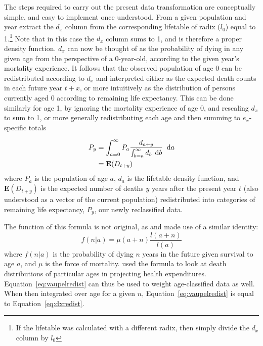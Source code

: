  \FloatBarrier
\label{sec:thetransformation}
The steps required to carry out the present data transformation are conceptually
simple, and easy to implement once understood. From a given
population and year extract the $d_x$ column from the corresponding lifetable of
radix ($l_0$) equal to 1.\footnote{If the lifetable was calculated with a
different radix, then simply divide the $d_x$ column by $l_0$} Note that in
this case the $d_x$ column sums to 1, and is therefore a proper density function. 
$d_x$ can now be thought of as the probability of dying in any given age from the
 perspective of a 0-year-old, according to the given year's mortality
 experience. It follows that the observed population of age 0 can be
 redistributed according to $d_x$ and interpreted either as the expected death
 counts in each future year
$t+x$, or more intuitively as the distribution of persons currently aged 0
according to remaining life expectancy. This can be done similarly for age 1, by ignoring the 
mortality experience of age 0, and rescaling $d_x$ to
sum to 1, or more generally redistributing each age and then summing to
$e_x$-specific totals

\begin{align}
\label{eq:dxredist}
P_{y} &= \int _{a = 0} ^{\infty} P_a \frac{d_{a + y}}{\int _{b
= a} ^{\infty} d_b\, \; \mathrm{d} b} \;\; \mathrm{d} a
\\
&= \mathbf{E}(D_{t+y}) \notag
\end{align}
where $P_a$ is the population of age $a$, $d_a$ is the
lifetable density function, and $\mathbf{E}(D_{t+y})$ is the expected number of
deaths $y$ years after the present year $t$ (also understood as a vector of the
current population) redistributed into categories of remaining life expectancy,
$P_{y}$, our newly reclassified data.

The function of this formula is not original, as
\citet{miller2001increasing} and \citet{vaupel2009life} made use of a similar
identity:
\begin{equation}
\label{eq:vaupelredist}
f(n | a) = \mu (a+n) \frac{l(a+n)}{l(a)}
\end{equation}
where $f(n | a) $ is the probability of dying $n$ years in the future given
survival to age $a$, and $\mu$ is the force of mortality.
\citet{miller2001increasing} used the formula to look at death distributions of
particular ages in projecting health expenditures.
Equation~\eqref{eq:vaupelredist} can thus be used to weight age-classified data
as well. When then integrated over age for a given $n$,
Equation~\eqref{eq:vaupelredist} is equal to Equation~\eqref{eq:dxredist}.

